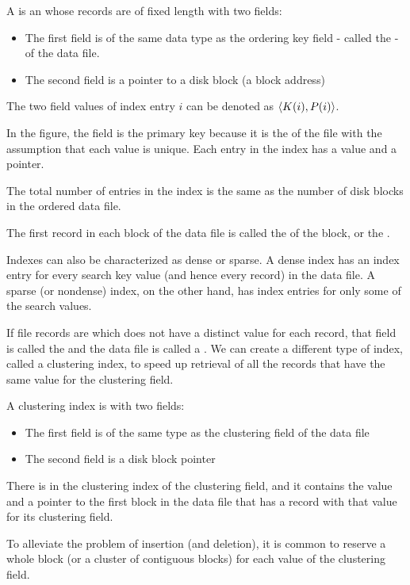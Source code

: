     \par A  is an  whose records are of fixed length with two fields:
    \begin{itemize}
      \item The first field is of the same data type as the ordering key field - called the  - of the data file.
      \item The second field is a pointer to a disk block (a block address)
    \end{itemize}
    \par The two field values of index entry $i$ can be denoted as $\langle K(i), P(i) \rangle$.
    \par In the figure, the  field is the primary key because it is the  of the file with the assumption that each value is unique. Each entry in the index has a  value and a pointer.
    \par The total number of entries in the index is the same as the number of disk blocks in the ordered data file.
    \par The first record in each block of the data file is called the  of the block, or the .
    \par Indexes can also be characterized as dense or sparse. A dense index has an index entry for every search key value (and hence every record) in the data file. A sparse (or nondense) index, on the other hand, has index entries for only some of the search values.

    \par If file records are  which does not have a distinct value for each record, that field is called the  and the data file is called a . We can create a different type of index, called a clustering index, to speed up retrieval of all the records that have the same value for the clustering field.

    \par A clustering index is  with two fields:
    \begin{itemize}
      \item The first field is of the same type as the clustering field of the data file
      \item The second field is a disk block pointer
    \end{itemize}
    \par There is  in the clustering index  of the clustering field, and it contains the value and a pointer to the first block in the data file that has a record with that value for its clustering field.
    \par To alleviate the problem of insertion (and deletion), it is common to reserve a whole block (or a cluster of contiguous blocks) for each value of the clustering field.

